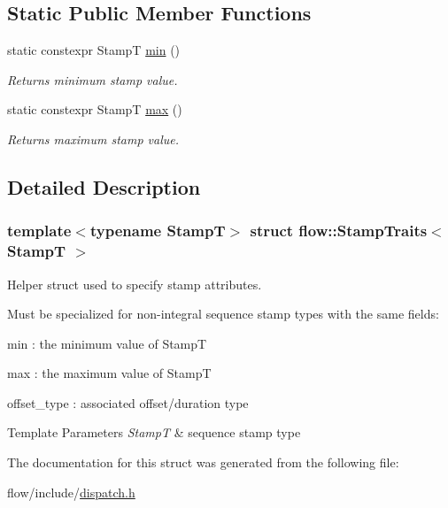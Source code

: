 \subsection*{Static Public Member Functions}
\begin{DoxyCompactItemize}
\item 
\mbox{\label{structflow_1_1_stamp_traits_a43b8cf3f34878e6d1d410c54a7ad6c4b}} 
static constexpr StampT \hyperlink{structflow_1_1_stamp_traits_a43b8cf3f34878e6d1d410c54a7ad6c4b}{min} ()
\begin{DoxyCompactList}\small\item\em Returns minimum stamp value. \end{DoxyCompactList}\item 
\mbox{\label{structflow_1_1_stamp_traits_ae0a0d2011371f185fc5f568ea0b549f4}} 
static constexpr StampT \hyperlink{structflow_1_1_stamp_traits_ae0a0d2011371f185fc5f568ea0b549f4}{max} ()
\begin{DoxyCompactList}\small\item\em Returns maximum stamp value. \end{DoxyCompactList}\end{DoxyCompactItemize}


\subsection{Detailed Description}
\subsubsection*{template$<$typename StampT$>$\newline
struct flow\+::\+Stamp\+Traits$<$ Stamp\+T $>$}

Helper struct used to specify stamp attributes. 

Must be specialized for non-\/integral sequence stamp types with the same fields\+:
\begin{DoxyItemize}
\item {\ttfamily min} \+: the minimum value of {\ttfamily StampT} 
\item {\ttfamily max} \+: the maximum value of {\ttfamily StampT} 
\item {\ttfamily offset\+\_\+type} \+: associated offset/duration type
\end{DoxyItemize}


\begin{DoxyTemplParams}{Template Parameters}
{\em StampT} & sequence stamp type \\
\hline
\end{DoxyTemplParams}


The documentation for this struct was generated from the following file\+:\begin{DoxyCompactItemize}
\item 
flow/include/\hyperlink{dispatch_8h}{dispatch.\+h}\end{DoxyCompactItemize}
